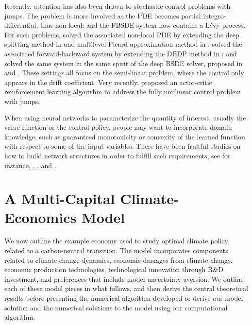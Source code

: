 \documentclass[12pt]{article}
\newcommand{\rh}[1]{\textcolor{orange}{\textsf{[RH: #1]}}}
\begin{document}
Recently, attention has also been drawn to stochastic control problems with jumps. The problem is more involved as the PDE becomes partial integro-differential, thus non-local; and the FBSDE system now contains a L\'{e}vy process. For such problems, \cite{boussange2022deep} solved the associated non-local PDE by extending the deep splitting method in \cite{beck2021deep} and multilevel Picard approximation method in \cite{hutzenthaler2019multilevel}; \cite{castro2022deep} solved the associated forward-backward system by extending the DBDP method in \cite{hurephamwarin2020deep}; and \cite{gnoatto2022deep} solved the same system in the same spirit of the deep BSDE solver, proposed in \cite{MR3736669} and \cite{HaJeE:18}. These settings all focus on the semi-linear problem, where the control only appears in the drift coefficient. Very recently, \cite{lu2024multi} proposed an actor-critic reinforcement learning algorithm to address the fully nonlinear control problem with jumps.

When using neural networks to parameterize the quantity of interest, usually the value function or the control policy, people may want to incorporate domain knowledge, such as guaranteed monotonicity or convexity of the learned function with respect to some of the input variables. There have been fruitful studies on how to build network structures in order to fulfill such requirements, see for instance, \cite{sill1997monotonic}, \cite{gupta2016monotonic}, \cite{wehenkel2019unconstrained} and \cite{runje2022constrained}.








\section{A Multi-Capital Climate-Economics Model}

We now outline the example economy used to study optimal climate policy related to a carbon-neutral transition. The model incorporates components related to climate change dynamics, economic damages from climate change, economic production technologies, technological innovation through R\&D investment, and preferences that include model uncertainty aversion. We outline each of these model pieces in what follows, and then derive the central theoretical results before presenting the numerical algorithm developed to derive our model solution and the numerical solutions to the model using our computational algorithm. 
\end{document}

